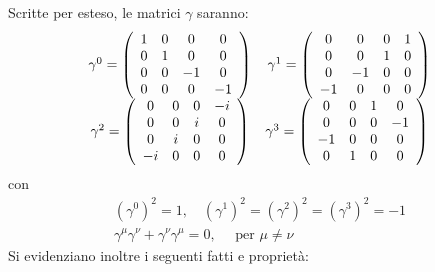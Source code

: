 \documentclass{subnucbo}
\begin{document}
Scritte per esteso, le matrici $\gamma$ saranno:
\begin{equation}
        \begin{array} {c} \gamma ^ { 0 } = \left( \begin{array} { c c c c } { 1 } & { 0 } & { 0 } & { 0 } \\ { 0 } & { 1 } & { 0 } & { 0 } \\ { 0 } & { 0 } & { - 1 } & { 0 } \\ { 0 } & { 0 } & { 0 } & { - 1 } \end{array} \right)  \quad \gamma ^ { 1 } = \left( \begin{array} { c c c c } { 0 } & { 0 } & { 0 } & { 1 } \\ { 0 } & { 0 } & { 1 } & { 0 } \\ { 0 } & { - 1 } & { 0 } & { 0 } \\ { - 1 } & { 0 } & { 0 } & { 0 } \end{array} \right) \\ \gamma ^ { 2 } = \left( \begin{array} { c c c c } { 0 } & { 0 } & { 0 } & { - i } \\ { 0 } & { 0 } & { i } & { 0 } \\ { 0 } & { i } & { 0 } & { 0 } \\ { - i } & { 0 } & { 0 } & { 0 } \end{array} \right)  \quad \gamma ^ { 3 } = \left( \begin{array} { c c c c } { 0 } & { 0 } & { 1 } & { 0 } \\ { 0 } & { 0 } & { 0 } & { - 1 } \\ { - 1 } & { 0 } & { 0 } & { 0 } \\ { 0 } & { 1 } & { 0 } & { 0 } \end{array} \right) \end{array}
        \label{eq:gamma_extended}
\end{equation}
con
\begin{equation}
        \begin{array} { c } { \left( \gamma ^ { 0 } \right) ^ { 2 } = 1 , \quad \left( \gamma ^ { 1 } \right) ^ { 2 } = \left( \gamma ^ { 2 } \right) ^ { 2 } = \left( \gamma ^ { 3 } \right) ^ { 2 } = - 1 } \\ { \gamma ^ { \mu } \gamma ^ { \nu } + \gamma ^ { \nu } \gamma ^ { \mu } = 0 , \quad \text { per } \mu \neq \nu } \end{array}
        \label{eq:gamma_properties}
\end{equation}
Si evidenziano inoltre i seguenti fatti e proprietà:
\end{document}
